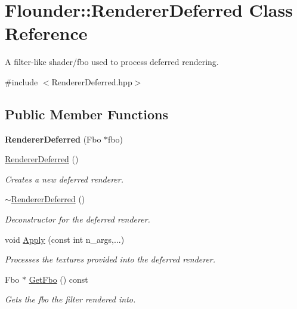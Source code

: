 \hypertarget{class_flounder_1_1_renderer_deferred}{}\section{Flounder\+:\+:Renderer\+Deferred Class Reference}
\label{class_flounder_1_1_renderer_deferred}


A filter-\/like shader/fbo used to process deferred rendering.  




{\ttfamily \#include $<$Renderer\+Deferred.\+hpp$>$}

\subsection*{Public Member Functions}
\begin{DoxyCompactItemize}
\item 
\mbox{\label{class_flounder_1_1_renderer_deferred_af459e36a8fdfc38345497a0f1a886832}} 
{\bfseries Renderer\+Deferred} (Fbo $\ast$fbo)
\item 
\hyperlink{class_flounder_1_1_renderer_deferred_a8a8b1c4aa439f19825481b1a94778a13}{Renderer\+Deferred} ()
\begin{DoxyCompactList}\small\item\em Creates a new deferred renderer. \end{DoxyCompactList}\item 
\hyperlink{class_flounder_1_1_renderer_deferred_a355578e18eae962d24a73261e4529daf}{$\sim$\+Renderer\+Deferred} ()
\begin{DoxyCompactList}\small\item\em Deconstructor for the deferred renderer. \end{DoxyCompactList}\item 
void \hyperlink{class_flounder_1_1_renderer_deferred_a1597b1d0f702dcfa0f3d20a7510fce24}{Apply} (const int n\+\_\+args,...)
\begin{DoxyCompactList}\small\item\em Processes the textures provided into the deferred renderer. \end{DoxyCompactList}\item 
Fbo $\ast$ \hyperlink{class_flounder_1_1_renderer_deferred_a842c246532630c2d90e064d13c18dd30}{Get\+Fbo} () const
\begin{DoxyCompactList}\small\item\em Gets the fbo the filter rendered into. \end{DoxyCompactList}\end{DoxyCompactItemize}
